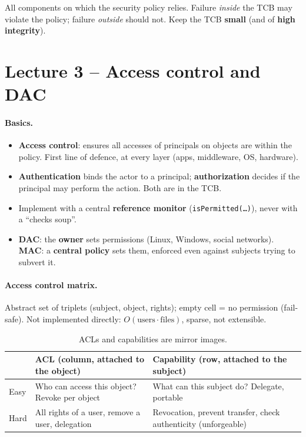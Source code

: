 \begin{definition}
All components on which the security policy relies. Failure \emph{inside} the TCB may violate the policy; failure \emph{outside} should not. Keep the TCB \textbf{small} (and of \textbf{high integrity}).
\end{definition}

\section{Lecture 3 -- Access control and DAC}

\paragraph{Basics.}
\begin{itemize}
    \item \textbf{Access control}: ensures all accesses of principals on objects are within the policy. First line of defence, at every layer (apps, middleware, OS, hardware).
    \item \textbf{Authentication} binds the actor to a principal; \textbf{authorization} decides if the principal may perform the action. Both are in the TCB.
    \item Implement with a central \textbf{reference monitor} (\texttt{isPermitted(\dots)}), never with a ``checks soup''.
    \item \textbf{DAC}: the \textbf{owner} sets permissions (Linux, Windows, social networks). \textbf{MAC}: a \textbf{central policy} sets them, enforced even against subjects trying to subvert it.
\end{itemize}

\paragraph{Access control matrix.} Abstract set of triplets (subject, object, rights); empty cell = no permission (fail-safe). Not implemented directly: $O(\text{users} \cdot \text{files})$, sparse, not extensible.

\begin{table}[h]
\centering
\small
\begin{tabular}{@{}p{2.3cm}p{5.6cm}p{5.6cm}@{}}
\toprule
 & \textbf{ACL} (column, attached to the object) & \textbf{Capability} (row, attached to the subject) \\
\midrule
Easy & Who can access this object? Revoke per object & What can this subject do? Delegate, portable \\
Hard & All rights of a user, remove a user, delegation & Revocation, prevent transfer, check authenticity (unforgeable) \\
\bottomrule
\end{tabular}
\caption{ACLs and capabilities are mirror images.}
\end{table}

